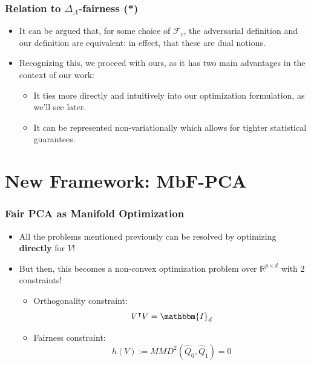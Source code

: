 \documentclass{beamer}
\begin{document}
\begin{frame}
	\frametitle{Relation to $\Delta_A$-fairness (*)}
	\begin{itemize}
		\item It can be argued that, for some choice of $\mathcal{F}_c$, the adversarial definition \cite{OA19} and our definition are equivalent: in effect, that these are dual notions.
		
		\item Recognizing this, we proceed with ours, as it has two main advantages in the context of our work:
		\begin{itemize}
			\item It ties more directly and intuitively into our optimization formulation, as we'll see later.
			
			\item It can be represented non-variationally %
			which allows for tighter statistical guarantees.
		\end{itemize}
	\end{itemize}
\end{frame}

\section{New Framework: MbF-PCA}

\begin{frame}
	\frametitle{Fair PCA as Manifold Optimization}
	\begin{itemize}
		\item All the problems mentioned previously can be resolved by optimizing {\bf directly} for $V$!
		
		\item But then, this becomes a non-convex optimization problem over $\mathbb{R}^{p \times d}$ with $2$ constraints!
		\begin{itemize}
			\item Orthogonality constraint:
			\begin{equation*}
				V^\intercal V = \mathbbm{I}_d
			\end{equation*}
		
			\item Fairness constraint:
			\begin{equation*}
				h(V) := MMD^2(\hat{Q}_0, \hat{Q}_1) = 0
			\end{equation*}
		\end{itemize}
	\end{itemize}
\end{frame}
\end{document}
